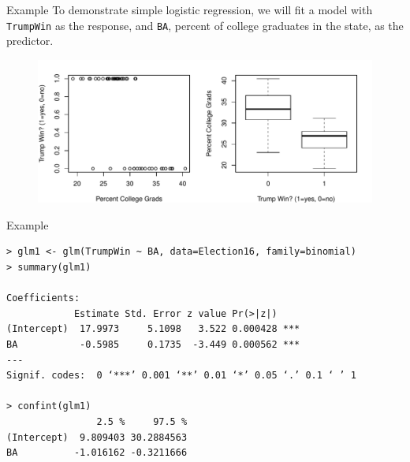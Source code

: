 \documentclass[10pt]{beamer}\usepackage[]{graphicx}\usepackage[]{color}
\begin{document}
\begin{frame}[fragile]{Example}
To demonstrate simple logistic regression, we will fit a model with \texttt{TrumpWin} as the response, and \texttt{BA}, percent of college graduates in the state, as the predictor.\\
\begin{figure}
\includegraphics[scale=0.5]{figure/scatter_box.pdf}
\end{figure}
\end{frame}

\begin{frame}[fragile]{Example}
\small
\begin{verbatim}
> glm1 <- glm(TrumpWin ~ BA, data=Election16, family=binomial) 
> summary(glm1)

Coefficients:
            Estimate Std. Error z value Pr(>|z|)    
(Intercept)  17.9973     5.1098   3.522 0.000428 ***
BA           -0.5985     0.1735  -3.449 0.000562 ***
---
Signif. codes:  0 ‘***’ 0.001 ‘**’ 0.01 ‘*’ 0.05 ‘.’ 0.1 ‘ ’ 1

> confint(glm1)
                2.5 %     97.5 %
(Intercept)  9.809403 30.2884563
BA          -1.016162 -0.3211666
\end{verbatim}
\normalsize
\vspace{10pt}
\end{frame}
\end{document}
